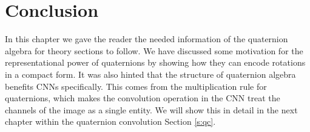 \section{Conclusion}\label{s:quatConc}
In this chapter we gave the reader the needed information of the quaternion algebra for theory sections to follow.
We have discussed some motivation for the representational power of quaternions by showing how they can encode rotations in a compact form.
It was also hinted that the structure of quaternion algebra benefits CNNs specifically.
This comes from the multiplication rule for quaternions, which makes the convolution operation in the CNN treat the channels of the image as a single entity. 
We will show this in detail in the next chapter within the quaternion convolution Section \ref{s:qc}.
















